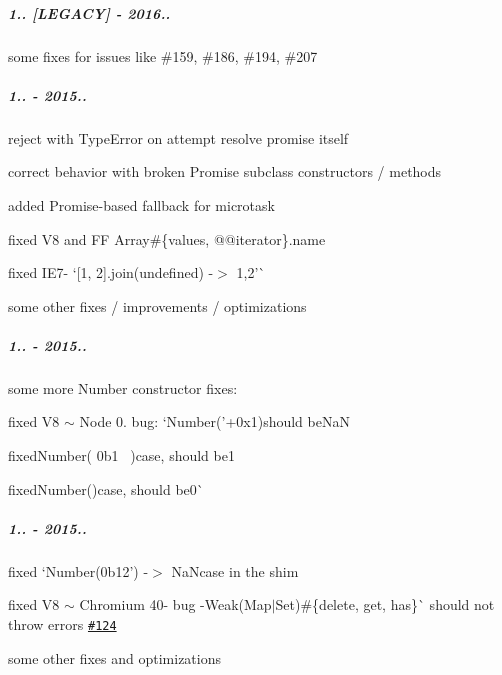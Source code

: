 \subparagraph*{1.. \mbox{[}L\+E\+G\+A\+CY\mbox{]} -\/ 2016..}


\begin{DoxyItemize}
\item some fixes for issues like \#159, \#186, \#194, \#207
\end{DoxyItemize}

\subparagraph*{1.. -\/ 2015..}


\begin{DoxyItemize}
\item reject with {\ttfamily Type\+Error} on attempt resolve promise itself
\item correct behavior with broken {\ttfamily Promise} subclass constructors / methods
\item added {\ttfamily Promise}-\/based fallback for microtask
\item fixed V8 and FF {\ttfamily Array\#\{values, @@iterator\}.name}
\item fixed I\+E7-\/ `\mbox{[}1, 2\mbox{]}.join(undefined) -\/$>$ \textquotesingle{}1,2'\`{}
\item some other fixes / improvements / optimizations
\end{DoxyItemize}

\subparagraph*{1.. -\/ 2015..}


\begin{DoxyItemize}
\item some more {\ttfamily Number} constructor fixes\+:
\begin{DoxyItemize}
\item fixed V8 $\sim$ Node 0. bug\+: `Number('+0x1\textquotesingle{}){\ttfamily should be}NaN{\ttfamily }
\item {\ttfamily fixed}Number(\textquotesingle{} 0b1~\newline
\textquotesingle{}){\ttfamily case, should be}1{\ttfamily }
\item {\ttfamily fixed}Number(){\ttfamily case, should be}0\`{}
\end{DoxyItemize}
\end{DoxyItemize}

\subparagraph*{1.. -\/ 2015..}


\begin{DoxyItemize}
\item fixed `Number(\textquotesingle{}0b12') -\/$>$ NaN{\ttfamily case in the shim}
\item {\ttfamily fixed V8 $\sim$ Chromium 40-\/ bug -\/}Weak(Map$\vert$\+Set)\#\{delete, get, has\}\`{} should not throw errors \href{https://github.com/zloirock/core-js/issues/124}{\tt \#124}
\item some other fixes and optimizations
\end{DoxyItemize}

